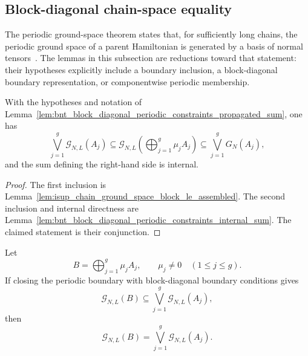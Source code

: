 \subsection{Block-diagonal chain-space equality}\label{subsec:block_diagonal_chain_equality}

The periodic ground-space theorem states that, for sufficiently long chains, the
periodic ground space of a parent Hamiltonian is generated by a basis of normal
tensors~\cite[Theorem~IV.16]{Cirac2021Matrix}. The lemmas in this subsection
are reductions toward that statement: their hypotheses explicitly include a
boundary inclusion, a block-diagonal boundary representation, or componentwise
periodic membership.

\begin{lemma}
    \label{lem:bnt_block_diagonal_periodic_chain_inclusions}
    \leanok
    With the hypotheses and notation of
    Lemma~\ref{lem:bnt_block_diagonal_periodic_constraints_propagated_sum}, one has
    \[
        \bigvee_{j=1}^g\mathcal G_{N,L}(A_j)
        \subseteq
        \mathcal G_{N,L}\!\left(\bigoplus_{j=1}^g\mu_jA_j\right)
        \subseteq
        \bigvee_{j=1}^gG_N(A_j),
    \]
    and the sum defining the right-hand side is internal.
\end{lemma}

\begin{proof}
    \leanok
    The first inclusion is
    Lemma~\ref{lem:isup_chain_ground_space_block_le_assembled}. The second
    inclusion and internal directness are
    Lemma~\ref{lem:bnt_block_diagonal_periodic_constraints_internal_sum}. The
    claimed statement is their conjunction.
\end{proof}

\begin{lemma}
    \label{lem:block_diagonal_boundary_closing_equality}
    \leanok
    Let
    \[
        B=\bigoplus_{j=1}^g\mu_jA_j,
        \qquad \mu_j\ne0\quad(1\le j\le g).
    \]
    If closing the periodic boundary with block-diagonal boundary conditions gives
    \[
        \mathcal G_{N,L}(B)
        \subseteq
        \bigvee_{j=1}^g\mathcal G_{N,L}(A_j),
    \]
    then
    \[
        \mathcal G_{N,L}(B)
        =
        \bigvee_{j=1}^g\mathcal G_{N,L}(A_j).
    \]
\end{lemma}

